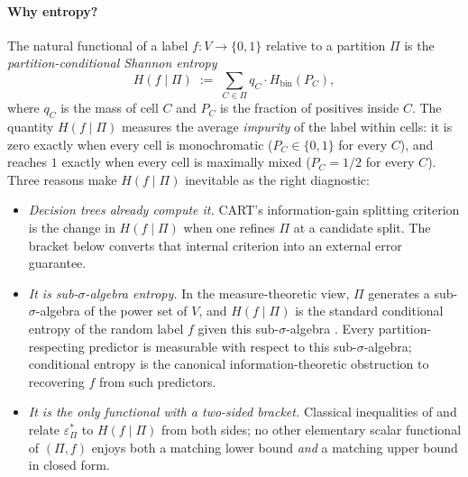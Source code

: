 \documentclass[10pt]{article}
\theoremstyle{definition}
\theoremstyle{remark}
\newcommand{\Hbin}{H_{\mathrm{bin}}}
\newcommand{\eps}{\varepsilon}
\newcommand{\epsP}{\eps^{\!*}_{\Pi}}
\begin{document}
\paragraph{Why entropy?} The natural functional of a label
$f : V \to \{0, 1\}$ relative to a partition $\Pi$ is the
\emph{partition-conditional Shannon entropy}
\[
  H(f \mid \Pi) \;:=\; \sum_{C \in \Pi} q_{C} \cdot \Hbin(P_{C}),
\]
where $q_{C}$ is the mass of cell $C$ and $P_{C}$ is the fraction
of positives inside $C$. The quantity $H(f \mid \Pi)$ measures
the average \emph{impurity} of the label within cells: it is zero
exactly when every cell is monochromatic ($P_{C} \in \{0, 1\}$
for every $C$), and reaches $1$ exactly when every cell is
maximally mixed ($P_{C} = 1/2$ for every $C$). Three reasons make
$H(f \mid \Pi)$ inevitable as the right diagnostic:
\begin{itemize}
  \item \emph{Decision trees already compute it.} CART's
    information-gain splitting criterion is the change in
    $H(f \mid \Pi)$ when one refines $\Pi$ at a candidate split.
    The bracket below converts that internal criterion into an
    external error guarantee.
  \item \emph{It is sub-$\sigma$-algebra entropy.} In the
    measure-theoretic view, $\Pi$ generates a sub-$\sigma$-algebra
    of the power set of $V$, and $H(f \mid \Pi)$ is the standard
    conditional entropy of the random label $f$ given this
    sub-$\sigma$-algebra \citep[\S2.1]{cover2006eit}. Every
    partition-respecting predictor is measurable with respect to
    this sub-$\sigma$-algebra; conditional entropy is the
    canonical information-theoretic obstruction to recovering
    $f$ from such predictors.
  \item \emph{It is the only functional with a two-sided bracket.}
    Classical inequalities of \citet{fano1961} and
    \citet{hellmanraviv1970} relate $\epsP$ to $H(f \mid \Pi)$
    from both sides; no other elementary scalar functional of
    $(\Pi, f)$ enjoys both a matching lower bound \emph{and} a
    matching upper bound in closed form.
\end{itemize}
\end{document}
